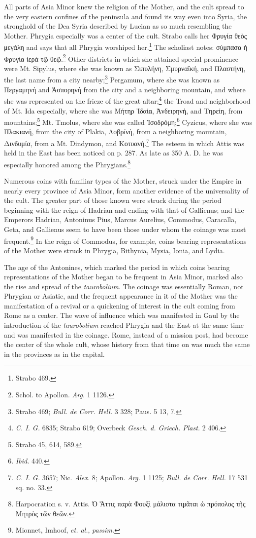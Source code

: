 \documentclass[a4paper, 11pt, oneside, polutonikogreek, english]{article}
\begin{document}
All parts of Asia Minor knew the religion of the Mother, and the cult spread to the very eastern confines of the peninsula and found its way even into Syria, the stronghold of the Dea Syria described by Lucian as so much resembling the Mother. Phrygia especially was a center of the cult. Strabo calls her Φρυγία θεὸς μεγάλη and says that all Phrygia worshiped her.\footnote{Strabo 469.} The scholiast notes: σύμπασα ἡ Φρυγία ἱερὰ τῷ θεῷ.\footnote{Schol. to Apollon. \emph{Arg.} 1 1126.} Other districts in which she attained special prominence were Mt. Sipylus, where she was known as Σιπυλήνη, Σμυρναϊκή, and Πλαστήνη, the last name from a city nearby;\footnote{Strabo 469; \emph{Bull. de Corr. Hell.} 3 328; Paus. 5 13, 7.} Pergamum, where she was known as Περγαμηνή and Ἀσπορηνή from the city and a neighboring mountain, and where she was represented on the frieze of the great altar;\footnote{\emph{C. I. G.} 6835; Strabo 619; Overbeck \emph{Gesch. d. Griech. Plast.} 2 406.} the Troad and neighborhood of Mt. Ida especially, where she was Μήτηρ Ἰδαία, Ἀνδειρηνή, and Τηρείη, from mountains;\footnote{Strabo 45, 614, 589.} Mt. Tmolus, where she was called Ἰσοδρόμη;\footnote{\emph{Ibid.} 440.} Cyzicus, where she was Πλακιανή, from the city of Plakia, Λοβρίνὴ, from a neighboring mountain, Δινδυμία, from a Mt. Dindymon, and Κοτυανή.\footnote{\emph{C. I. G.} 3657; Nic. \emph{Alex.} 8; Apollon. \emph{Arg.} 1 1125; \emph{Bull. de Corr. Hell.} 17 531 sq. no. 33.} The esteem in which Attis was held in the East has been noticed on p. 287. As late as 350 A. D. he was especially honored among the Phrygians.\footnote{Harpocration s. v. Attis. Ὁ Ἄττις παρὰ Φουξὶ μάλιστα τιμᾶται ὡ πρόπολος τῆς Μητρὸς τῶν θεῶν.}

Numerous coins with familiar types of the Mother, struck under the Empire in nearly every province of Asia Minor, form another evidence of the universality of the cult. The greater part of those known were struck during the period beginning with the reign of Hadrian and ending with that of Gallienus; and the Emperors Hadrian, Antoninus Pius, Marcus Aurelius, Commodus, Caracalla, Geta, and Gallienus seem to have been those under whom the coinage was most frequent.\footnote{Mionnet, Imhoof, \emph{et. al.}, \emph{passim.}} In the reign of Commodus, for example, coins bearing representations of the Mother were struck in Phrygia, Bithynia, Mysia, Ionia, and Lydia.

The age of the Antonines, which marked the period in which coins bearing representations of the Mother began to be frequent in Asia Minor, marked also the rise and spread of the \emph{taurobolium}. The coinage was essentially Roman, not Phrygian or Asiatic, and the frequent appearance in it of the Mother was the manifestation of a revival or a quickening of interest in the cult coming from Rome as a center. The wave of influence which was manifested in Gaul by the introduction of the \emph{taurobolium} reached Phrygia and the East at the same time and was manifested in the coinage. Rome, instead of a mission post, had become the center of the whole cult, whose history from that time on was much the same in the provinces as in the capital.
\end{document}
